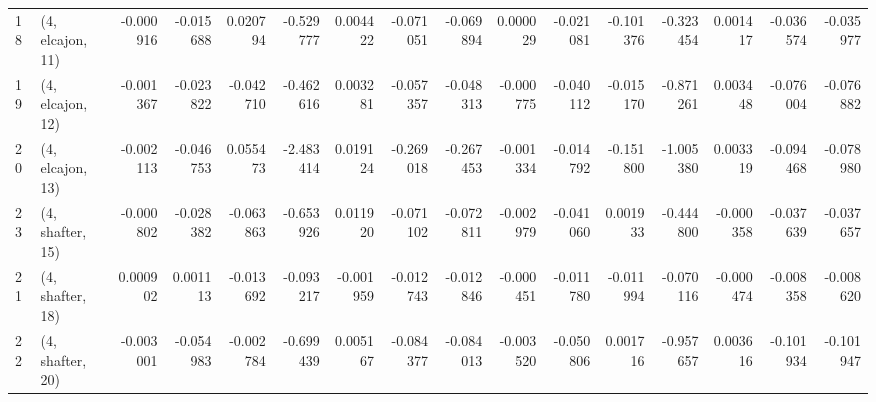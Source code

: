 \begin{tabular}{llrrrrrrrrrrrrrr}
18 &  (4, elcajon, 11) &  -0.000916 & -0.015688 &  0.020794 &  -0.529777 &  0.004422 &  -0.071051 & -0.069894 &  0.000029 & -0.021081 & -0.101376 &  -0.323454 &  0.001417 & -0.036574 & -0.035977 \\
19 &  (4, elcajon, 12) &  -0.001367 & -0.023822 & -0.042710 &  -0.462616 &  0.003281 &  -0.057357 & -0.048313 & -0.000775 & -0.040112 & -0.015170 &  -0.871261 &  0.003448 & -0.076004 & -0.076882 \\
20 &  (4, elcajon, 13) &  -0.002113 & -0.046753 &  0.055473 &  -2.483414 &  0.019124 &  -0.269018 & -0.267453 & -0.001334 & -0.014792 & -0.151800 &  -1.005380 &  0.003319 & -0.094468 & -0.078980 \\
23 &  (4, shafter, 15) &  -0.000802 & -0.028382 & -0.063863 &  -0.653926 &  0.011920 &  -0.071102 & -0.072811 & -0.002979 & -0.041060 &  0.001933 &  -0.444800 & -0.000358 & -0.037639 & -0.037657 \\
21 &  (4, shafter, 18) &   0.000902 &  0.001113 & -0.013692 &  -0.093217 & -0.001959 &  -0.012743 & -0.012846 & -0.000451 & -0.011780 & -0.011994 &  -0.070116 & -0.000474 & -0.008358 & -0.008620 \\
22 &  (4, shafter, 20) &  -0.003001 & -0.054983 & -0.002784 &  -0.699439 &  0.005167 &  -0.084377 & -0.084013 & -0.003520 & -0.050806 &  0.001716 &  -0.957657 &  0.003616 & -0.101934 & -0.101947 \\
\bottomrule
\end{tabular}
